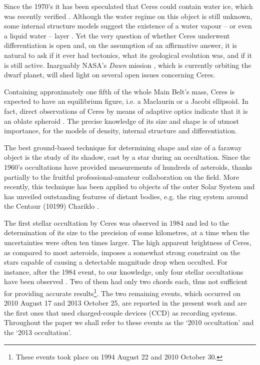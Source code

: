 \documentclass[useAMS,usenatbib]{mn2e}
\begin{document}
Since the 1970's it has been speculated that Ceres could contain water ice, which was recently verified \citep{Kuppers2014}. Although the water regime on this object is still unknown, some internal structure models suggest the existence of a water vapour -- or even a liquid water -- layer \citep{CastilloR2011}. Yet the very question of whether Ceres underwent differentiation is open and, on the assumption of an affirmative answer, it is natural to ask if it ever had tectonics, what its geological evolution was, and if it is still active. Inarguably NASA's \textit{Dawn} mission \citep{Russell2004}, which is currently orbiting the dwarf planet, will shed light on several open issues concerning Ceres.

Containing approximately one fifth of the whole Main Belt's mass, Ceres is expected to have an equilibrium figure, i.e. a Maclaurin or a Jacobi ellipsoid. In fact, direct observations of Ceres by means of adaptive optics indicate that it is an oblate spheroid \citep{Drummond2014}. The precise knowledge of its size and shape is of utmost importance, for the models of density, internal structure and differentiation.%

The best ground-based technique for determining shape and size of a faraway object is the study of its shadow, cast by a star during an occultation. Since the 1960's occultations have provided measurements of hundreds of asteroids, thanks partially to the fruitful professional-amateur collaboration on the field. More recently, this technique has been applied to objects of the outer Solar System and has unveiled outstanding features of distant bodies, e.g. the ring system around the Centaur (10199) Chariklo \citep{BragaRibas2014}.

The first stellar occultation by Ceres was observed in 1984 \citep{Millis1987} and led to the determination of its size to the precision of some kilometres, at a time when the uncertainties were often ten times larger. The high apparent brightness of Ceres, as compared to most asteroids, imposes a somewhat strong constraint on the stars capable of causing a detectable magnitude drop when occulted. For instance, after the 1984 event, to our knowledge, only four stellar occultations have been observed \citep{Dunham2014}. Two of them had only two chords each, thus not sufficient for providing accurate results\footnote{These events took place on 1994 August 22 and 2010 October 30.}. The two remaining events, which occurred on 2010 August 17 and 2013 October 25, are reported in the present work and are the first ones that used charged-couple devices (CCD) as recording systems. %
Throughout the paper we shall refer to these events as the `2010 occultation' and the `2013 occultation'.
\end{document}
